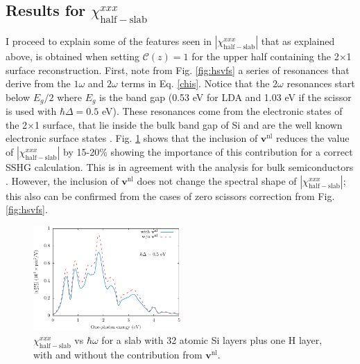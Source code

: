 
\subsection{\texorpdfstring{Results for $\chi^{xxx}_{\mathrm{half-slab}}$}
{Results for Xxxx(half-slab)}}

I proceed to explain some of the features seen in
$|\chi^{xxx}_{\mathrm{half-slab}}|$ that as explained above, is obtained when
setting ${\mathbf{\mathcal{C}}}(z)=1$ for the upper half containing the
2$\times$1 surface reconstruction. First, note from Fig. \ref{fig:hsvfs} a
series of resonances that derive from the $1\omega$ and $2\omega$ terms in Eq.
\eqref{chis}. Notice that the $2\omega$ resonances start below $E_{g}/2$ where
$E_{g}$ is the band gap (0.53 eV for LDA and 1.03 eV if the scissor is used with
$\hbar\Delta=0.5$ eV). These resonances come from the electronic states of the
2$\times$1 surface, that lie inside the bulk band gap of Si and are the well
known electronic surface states \cite{rohlfingPRB95}. Fig. \ref{fig:vnl} shows
that the inclusion of $\mathbf{v}^\mathrm{nl}$ reduces the value of
$|\chi^{xxx}_{\mathrm{half-slab}}|$ by 15-20\% showing the importance of this
contribution for a correct SSHG calculation. This is in agreement with the
analysis for bulk semiconductors \cite{luppiPRB08}. However, the inclusion of
$\mathbf{v}^\mathrm{nl}$ does not change the spectral shape of
$|\chi^{xxx}_{\mathrm{half-slab}}|$; this also can be confirmed from the cases
of zero scissors correction from Fig. \ref{fig:hsvfs}.

\begin{figure}[H]
\centering 
\includegraphics[width=0.5\textwidth]{content/figures/fig-4_1_04}
\caption{$\chi^{xxx}_{\mathrm{half-slab}}$ vs $\hbar\omega$ for a slab with 32
atomic Si layers plus one H layer, with and without the contribution from
$\mathbf{v}^\mathrm{nl}$.}
\label{fig:vnl}
\end{figure}

